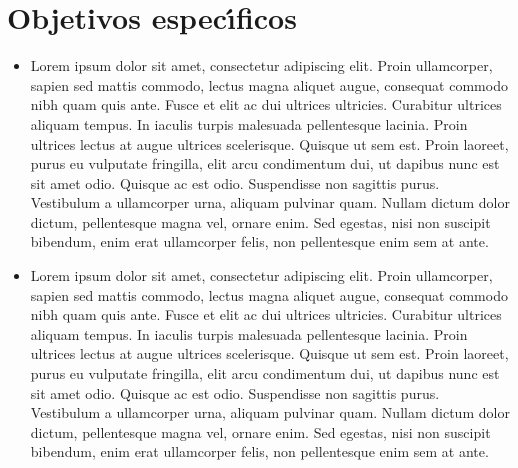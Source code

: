 \documentclass[letterpaper,oneside,openany,11pt]{book}
\begin{document}
\section{Objetivos espec\'{\i}ficos}
\begin{itemize}
	\item Lorem ipsum dolor sit amet, consectetur adipiscing elit. Proin ullamcorper, sapien sed mattis commodo, lectus magna aliquet augue, consequat commodo nibh quam quis ante. Fusce et elit ac dui ultrices ultricies. Curabitur ultrices aliquam tempus. In iaculis turpis malesuada pellentesque lacinia. Proin ultrices lectus at augue ultrices scelerisque. Quisque ut sem est. Proin laoreet, purus eu vulputate fringilla, elit arcu condimentum dui, ut dapibus nunc est sit amet odio. Quisque ac est odio. Suspendisse non sagittis purus. Vestibulum a ullamcorper urna, aliquam pulvinar quam. Nullam dictum dolor dictum, pellentesque magna vel, ornare enim. Sed egestas, nisi non suscipit bibendum, enim erat ullamcorper felis, non pellentesque enim sem at ante.
	\item Lorem ipsum dolor sit amet, consectetur adipiscing elit. Proin ullamcorper, sapien sed mattis commodo, lectus magna aliquet augue, consequat commodo nibh quam quis ante. Fusce et elit ac dui ultrices ultricies. Curabitur ultrices aliquam tempus. In iaculis turpis malesuada pellentesque lacinia. Proin ultrices lectus at augue ultrices scelerisque. Quisque ut sem est. Proin laoreet, purus eu vulputate fringilla, elit arcu condimentum dui, ut dapibus nunc est sit amet odio. Quisque ac est odio. Suspendisse non sagittis purus. Vestibulum a ullamcorper urna, aliquam pulvinar quam. Nullam dictum dolor dictum, pellentesque magna vel, ornare enim. Sed egestas, nisi non suscipit bibendum, enim erat ullamcorper felis, non pellentesque enim sem at ante.
\end{itemize}


\end{document}
